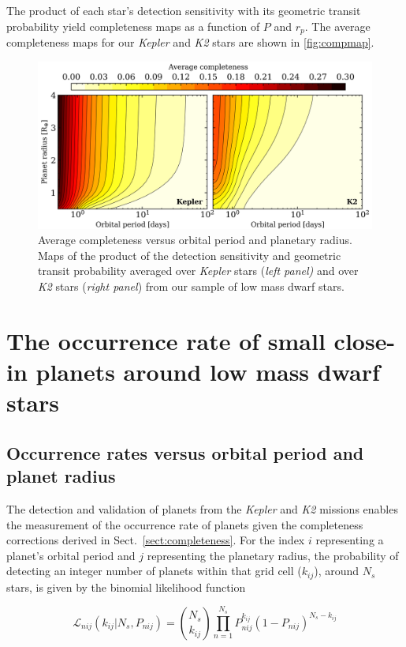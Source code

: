 \documentclass[twocolumn]{emulateapj}
\newcommand{\kepler}[1]{\emph{Kepler}#1}
\newcommand{\ktwo}[1]{\emph{K2}#1}
\begin{document}
The product of each star's detection sensitivity with its geometric transit probability yield completeness
maps as a function of $P$ and $r_p$. The average completeness maps for our \kepler{} and \ktwo{} stars are
shown in \autoref{fig:compmap}.

\begin{figure}
  \centering
  \includegraphics[width=0.98\hsize]{figures/compmap.png}
  \caption{Average completeness versus orbital period and planetary radius.
    Maps of the product of the detection sensitivity and geometric transit probability averaged over \kepler{} stars
    (\emph{left panel)} and over \ktwo{} stars (\emph{right panel}) from our sample of low mass dwarf stars.} 
  \label{fig:compmap}
\end{figure}


\section{The occurrence rate of small close-in planets around low mass dwarf stars} \label{sect:occurrence}
\subsection{Occurrence rates versus orbital period and planet radius} \label{sect:fmap}
The detection and validation of planets from the \kepler{} and \ktwo{} missions enables the measurement of the
occurrence rate of planets given the completeness corrections derived in Sect.~\ref{sect:completeness}.
For the index $i$ representing a planet's orbital period and $j$ representing the planetary
radius, the probability of detecting an integer number of planets within that grid cell ($k_{ij}$), around
$N_s$ stars, is given by the binomial likelihood function

\begin{equation}
  \mathcal{L}_{nij}(k_{ij}|N_s,P_{nij}) = \binom{N_s}{k_{ij}} \prod_{n=1}^{N_s} P_{nij}^{k_{ij}} (1-P_{nij})^{N_s-k_{ij}}
  \label{eq:lnL}
\end{equation}
\end{document}
